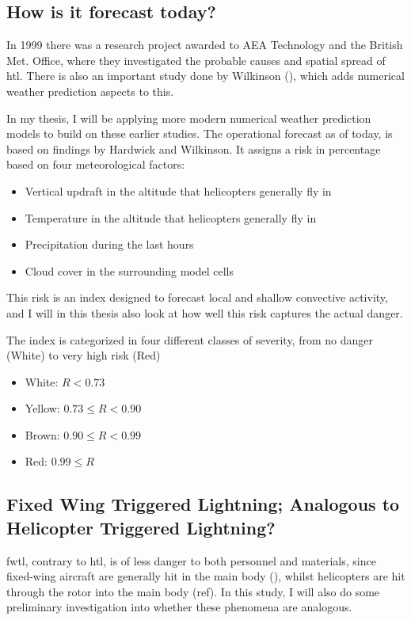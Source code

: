 \subsection{How is it forecast today?}

In 1999 there was a research project awarded to AEA Technology \cite{hardwick} and the British Met. Office, where they investigated the probable causes and spatial spread of \acrshort{htl}. There is also an important study done by Wilkinson (\cite{wilkinson}), which adds numerical weather prediction aspects to this. 

In my thesis, I will be applying more modern numerical weather prediction models to build on these earlier studies. The operational forecast as of today, is based on findings by Hardwick and Wilkinson. It assigns a risk in percentage based on four meteorological factors:

\begin{itemize}
    \item Vertical updraft in the altitude that helicopters generally fly in
    \item Temperature in the altitude that helicopters generally fly in
    \item Precipitation during the last hours
    \item Cloud cover in the surrounding model cells
\end{itemize}

This risk is an index designed to forecast local and shallow convective activity, and I will in this thesis also look at how well this risk captures the actual danger.

The index is categorized in four different classes of severity, from no danger (White) to very high risk (Red)
\begin{itemize}
    \item White: $R < 0.73$
    \item Yellow: $0.73 \leq R < 0.90 $
    \item Brown: $0.90 \leq R < 0.99 $
    \item Red: $0.99 \leq R $
\end{itemize}


\subsection{Fixed Wing Triggered Lightning; Analogous to Helicopter Triggered Lightning?}

\acrfull{fwtl}, contrary to \acrshort{htl}, is of less danger to both personnel and materials, since fixed-wing aircraft are generally hit in the main body (\cite{Petrov12}), whilst helicopters are hit through the rotor into the main body (ref).  In this study, I will also do some preliminary investigation into whether these phenomena are analogous. 






